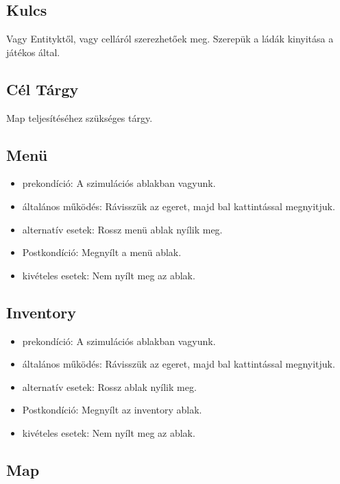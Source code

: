 \subsection{Kulcs}

Vagy Entityktől, vagy celláról szerezhetőek meg.
Szerepük a ládák kinyitása a játékos által.

\subsection{Cél Tárgy}

Map teljesítéséhez szükséges tárgy.


\subsection{Menü}

\begin{itemize}
    \item prekondíció: A szimulációs ablakban vagyunk.
    \item általános működés: Rávisszük az egeret, majd bal kattintással megnyitjuk.
    \item alternatív esetek: Rossz menü ablak nyílik meg.
    \item Postkondíció: Megnyílt a menü ablak.
    \item kivételes esetek: Nem nyílt meg az ablak.
\end{itemize}

\subsection{Inventory}

\begin{itemize}
    \item prekondíció: A szimulációs ablakban vagyunk.
    \item általános működés: Rávisszük az egeret, majd bal kattintással megnyitjuk.
    \item alternatív esetek: Rossz ablak nyílik meg.
    \item Postkondíció: Megnyílt az inventory ablak.
    \item kivételes esetek: Nem nyílt meg az ablak.
\end{itemize}

\subsection{Map}

